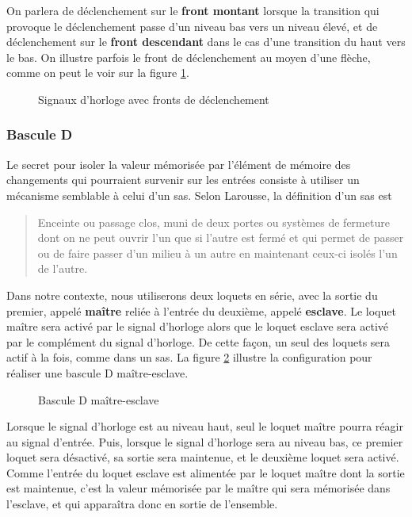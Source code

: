 \documentclass[11pt]{article}
\begin{document}
On parlera de déclenchement sur le \textbf{front montant} lorsque la
transition qui provoque le déclenchement passe d'un niveau bas vers un
niveau élevé, et de déclenchement sur le \textbf{front descendant} dans le
cas d'une transition du haut vers le bas.  On illustre parfois le
front de déclenchement au moyen d'une flèche, comme on peut le voir
sur la figure \ref{fig:orgd7c101c}.

\begin{figure}[htbp]
\centering

\caption{\label{fig:orgd7c101c}Signaux d'horloge avec fronts de déclenchement}
\end{figure}

\subsubsection{Bascule D}
\label{sec:orgeeffa15}

Le secret pour isoler la valeur mémorisée par l'élément de mémoire des
changements qui pourraient survenir sur les entrées consiste à
utiliser un mécanisme semblable à celui d'un sas. Selon Larousse, la
définition d'un sas est

\begin{quote}
Enceinte ou passage clos, muni de deux portes ou systèmes de fermeture
dont on ne peut ouvrir l'un que si l'autre est fermé et qui permet de
passer ou de faire passer d'un milieu à un autre en maintenant ceux-ci
isolés l'un de l'autre.
\end{quote}

Dans notre contexte, nous utiliserons deux loquets en série, avec la
sortie du premier, appelé \textbf{maître} reliée à l'entrée du deuxième,
appelé \textbf{esclave}. Le loquet maître sera activé par le signal d'horloge
alors que le loquet esclave sera activé par le complément du signal
d'horloge. De cette façon, un seul des loquets sera actif à la fois,
comme dans un sas. La figure \ref{fig:org3733a0f} illustre la
configuration pour réaliser une bascule D maître-esclave.

\begin{figure}[htbp]
\centering

\caption{\label{fig:org3733a0f}Bascule D maître-esclave}
\end{figure}

Lorsque le signal d'horloge est au niveau haut, seul le loquet maître
pourra réagir au signal d'entrée. Puis, lorsque le signal d'horloge
sera au niveau bas, ce premier loquet sera désactivé, sa sortie sera
maintenue, et le deuxième loquet sera activé. Comme l'entrée du loquet
esclave est alimentée par le loquet maître dont la sortie est
maintenue, c'est la valeur mémorisée par le maître qui sera mémorisée
dans l'esclave, et qui apparaîtra donc en sortie de l'ensemble.
\end{document}
